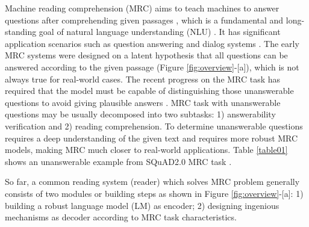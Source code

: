 \documentclass[letterpaper]{article} %
\begin{document}
Machine reading comprehension (MRC) aims to teach machines to answer questions after comprehending given passages \cite{hermann2015teaching,Joshi2017TriviaQA,Rajpurkar2018Know}, which is a fundamental and long-standing goal of natural language understanding (NLU) \cite{zhang2020mrc}. It has significant application scenarios %
such as question answering and dialog systems \cite{zhang2018modeling,choi2018quac,reddy2019coqa,zhang2018mrc,xu2020topic,zhu2018lingke}.
The early MRC systems \cite{kadlec2016text,Chen2016A,Dhingra2017Gated,Wang2017Gated,Seo2016Bidirectional} were designed on a latent hypothesis that all questions can be answered according to the given passage (Figure \ref{fig:overview}-[a]), which is not always true for real-world cases. %
The recent progress on the MRC task has required that the model must be capable of distinguishing those unanswerable questions to avoid giving plausible answers \cite{Rajpurkar2018Know}. MRC task with unanswerable questions may be usually decomposed into two subtasks: 1) answerability verification and 2) reading comprehension.
To determine unanswerable questions requires a deep understanding of the given text and requires more robust MRC models, making MRC much closer to real-world applications. Table \ref{table01} shows an unanswerable example from SQuAD2.0 MRC task \cite{Rajpurkar2018Know}.






So far, a common reading system (reader) which solves MRC problem generally consists of two modules or building steps as shown in Figure \ref{fig:overview}-[a]:
1) building a robust language model (LM) as encoder; 2) designing ingenious mechanisms as decoder according to MRC task characteristics.
\end{document}
